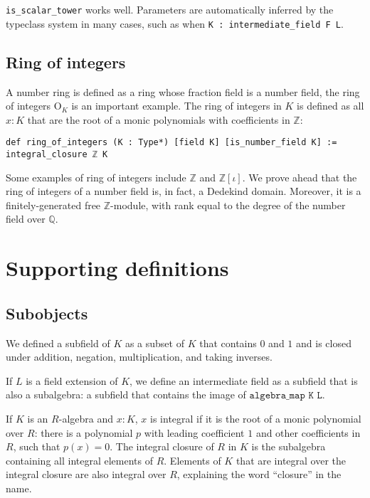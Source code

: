 \documentclass[a4paper,USenglish,cleveref, autoref, thm-restate]{lipics-v2021}
\newcommand{\lean}[1]{\texttt{#1}\xspace} %
\newcommand{\OK}{\mathrm{O}_K}
\newcommand{\Q}{\mathbb{Q}}
\newcommand{\Z}{\mathbb{Z}}
\begin{document}
\lean{is\_scalar\_tower} works well.
Parameters are automatically inferred by the typeclass system in many cases,
such as when \lean{K : intermediate\_field F L}.

\subsection{Ring of integers}

A number ring is defined as a ring whose fraction field is a number field, the ring of integers $\OK$ is an important example.
The ring of integers in $K$ is defined as all $x : K$ that are the root of a monic polynomials with coefficients in $\Z$:
\begin{lstlisting}
def ring_of_integers (K : Type*) [field K] [is_number_field K] :=
integral_closure ℤ K
\end{lstlisting}

Some examples of ring of integers include $\Z$ and $\Z[\iota]$. We prove ahead that the ring of integers of a number field is, in fact, a Dedekind domain. Moreover, it is a finitely-generated free $\Z$-module, with rank equal to the degree of the number field over $\Q$. 


\section{Supporting definitions}


\subsection{Subobjects}

We defined a subfield of $K$ as a subset of $K$ that contains $0$ and $1$ and is closed under addition, negation, multiplication, and taking inverses.

If $L$ is a field extension of $K$, we define an intermediate field as a subfield that is also a subalgebra: a subfield that contains the image of $\lean{algebra\_map K L}$.

If $K$ is an $R$-algebra and $x : K$, $x$ is integral if it is the root of a monic polynomial over $R$: there is a polynomial $p$ with leading coefficient $1$ and other coefficients in $R$, such that $p(x) = 0$.
The integral closure of $R$ in $K$ is the subalgebra containing all integral elements of $R$.
Elements of $K$ that are integral over the integral closure are also integral over $R$, explaining the word ``closure'' in the name.
\end{document}
